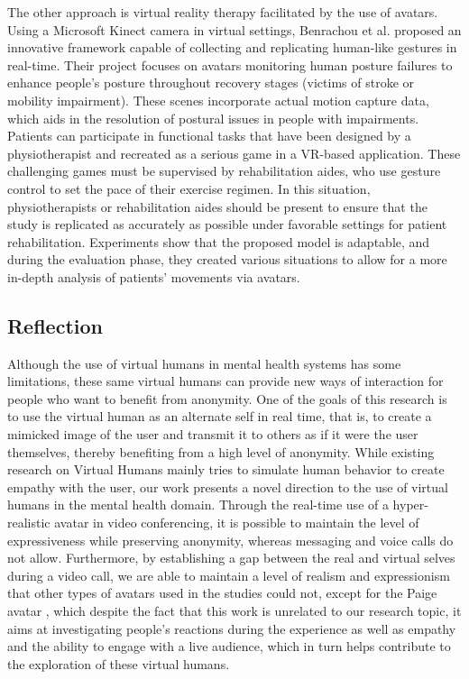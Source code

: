 The other approach is virtual reality therapy facilitated by the use of avatars. Using a Microsoft Kinect camera in virtual settings, Benrachou et al. \cite{BEN20} proposed an innovative framework capable of collecting and replicating human-like gestures in real-time. Their project focuses on avatars monitoring human posture failures to enhance people's posture throughout recovery stages (victims of stroke or mobility impairment). These scenes incorporate actual motion capture data, which aids in the resolution of postural issues in people with impairments. Patients can participate in functional tasks that have been designed by a physiotherapist and recreated as a serious game in a VR-based application. These challenging games must be supervised by rehabilitation aides, who use gesture control to set the pace of their exercise regimen. In this situation, physiotherapists or rehabilitation aides should be present to ensure that the study is replicated as accurately as possible under favorable settings for patient rehabilitation. Experiments show that the proposed model is adaptable, and during the evaluation phase, they created various situations to allow for a more in-depth analysis of patients' movements via avatars.

\subsection{Reflection}
Although the use of virtual humans in mental health systems has some limitations, these same virtual humans can provide new ways of interaction for people who want to benefit from anonymity. One of the goals of this research is to use the virtual human as an alternate self in real time, that is, to create a mimicked image of the user and transmit it to others as if it were the user themselves, thereby benefiting from a high level of anonymity. While existing research on Virtual Humans mainly tries to simulate human behavior to create empathy with the user, our work presents a novel direction to the use of virtual humans in the mental health domain. Through the real-time use of a hyper-realistic avatar in video conferencing, it is possible to maintain the level of expressiveness while preserving anonymity, whereas messaging and voice calls do not allow. Furthermore, by establishing a gap between the real and virtual selves during a video call, we are able to maintain a level of realism and expressionism that other types of avatars used in the studies could not, except for the Paige avatar \cite{ZEL19}, which despite the fact that this work is unrelated to our research topic, it aims at investigating people's reactions during the experience as well as empathy and the ability to engage with a live audience, which in turn helps contribute to the exploration of these virtual humans.